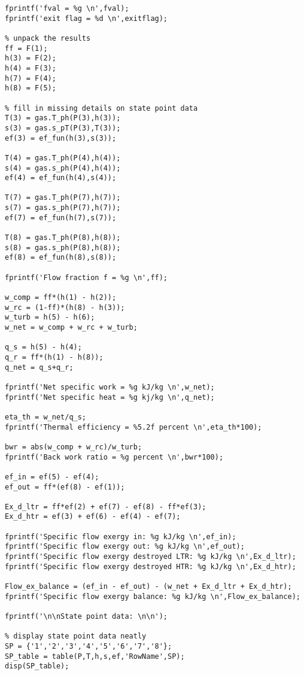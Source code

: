 \begin{fullwidth}
\begin{lstlisting}
fprintf('fval = %g \n',fval);
fprintf('exit flag = %d \n',exitflag);

% unpack the results
ff = F(1);
h(3) = F(2);
h(4) = F(3);
h(7) = F(4);
h(8) = F(5);

% fill in missing details on state point data
T(3) = gas.T_ph(P(3),h(3));
s(3) = gas.s_pT(P(3),T(3));
ef(3) = ef_fun(h(3),s(3));

T(4) = gas.T_ph(P(4),h(4));
s(4) = gas.s_ph(P(4),h(4));
ef(4) = ef_fun(h(4),s(4));

T(7) = gas.T_ph(P(7),h(7));
s(7) = gas.s_ph(P(7),h(7));
ef(7) = ef_fun(h(7),s(7));

T(8) = gas.T_ph(P(8),h(8));
s(8) = gas.s_ph(P(8),h(8));
ef(8) = ef_fun(h(8),s(8));

fprintf('Flow fraction f = %g \n',ff);

w_comp = ff*(h(1) - h(2));
w_rc = (1-ff)*(h(8) - h(3));
w_turb = h(5) - h(6);
w_net = w_comp + w_rc + w_turb;

q_s = h(5) - h(4);
q_r = ff*(h(1) - h(8));
q_net = q_s+q_r;

fprintf('Net specific work = %g kJ/kg \n',w_net);
fprintf('Net specific heat = %g kj/kg \n',q_net);

eta_th = w_net/q_s;
fprintf('Thermal efficiency = %5.2f percent \n',eta_th*100);

bwr = abs(w_comp + w_rc)/w_turb;
fprintf('Back work ratio = %g percent \n',bwr*100);

ef_in = ef(5) - ef(4);
ef_out = ff*(ef(8) - ef(1));

Ex_d_ltr = ff*ef(2) + ef(7) - ef(8) - ff*ef(3);
Ex_d_htr = ef(3) + ef(6) - ef(4) - ef(7);

fprintf('Specific flow exergy in: %g kJ/kg \n',ef_in);
fprintf('Specific flow exergy out: %g kJ/kg \n',ef_out);
fprintf('Specific flow exergy destroyed LTR: %g kJ/kg \n',Ex_d_ltr);
fprintf('Specific flow exergy destroyed HTR: %g kJ/kg \n',Ex_d_htr);

Flow_ex_balance = (ef_in - ef_out) - (w_net + Ex_d_ltr + Ex_d_htr);
fprintf('Specific flow exergy balance: %g kJ/kg \n',Flow_ex_balance);

fprintf('\n\nState point data: \n\n');

% display state point data neatly
SP = {'1','2','3','4','5','6','7','8'};
SP_table = table(P,T,h,s,ef,'RowName',SP);
disp(SP_table);
\end{lstlisting}
\end{fullwidth}

